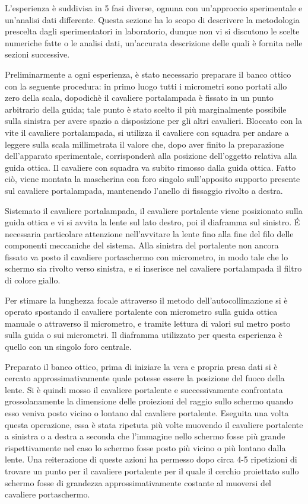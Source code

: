 L'esperienza \`e suddivisa in 5 fasi diverse, ognuna con 
un'approccio sperimentale e un'analisi dati differente. Questa 
sezione ha lo scopo di descrivere la metodologia prescelta dagli 
sperimentatori in laboratorio, dunque non vi si discutono le scelte 
numeriche fatte o le analisi dati, un'accurata descrizione delle 
quali è fornita nelle sezioni successive.

Preliminarmente a ogni esperienza, è stato necessario preparare il 
banco ottico con la seguente procedura: in primo luogo tutti i 
micrometri sono portati allo zero della scala, dopodichè il 
cavaliere portalampada \`e fissato in un punto arbitrario della 
guida; tale punto è stato scelto il più marginalmente possibile 
sulla sinistra per avere spazio a disposizione per gli altri 
cavalieri. Bloccato con la vite il cavaliere portalampada, si 
utilizza il cavaliere con squadra per andare a leggere sulla scala 
millimetrata il valore che, dopo aver finito la preparazione 
dell'apparato sperimentale, corrisponder\`a alla posizione 
dell'oggetto relativa alla guida ottica. Il cavaliere con squadra va 
subito rimosso dalla guida ottica. Fatto ciò, viene montata la 
mascherina con foro singolo sull'apposito supporto presente sul 
cavaliere portalampada, mantenendo l'anello di fissaggio rivolto a 
destra.

Sistemato il cavaliere portalampada, il cavaliere 
portalente viene posizionato sulla guida ottica e vi si avvita la 
lente sul lato destro, poi il diaframma sul sinistro. \'E necessaria 
particolare attenzione nell'avvitare la lente fino alla fine del 
filo delle componenti meccaniche del sistema. Alla sinistra del 
portalente non ancora fissato va posto il cavaliere portaschermo con 
micrometro, in modo tale che lo schermo sia rivolto verso sinistra, 
e si inserisce nel cavaliere portalampada il filtro di colore giallo.

Per stimare la lunghezza focale attraverso il metodo 
dell'autocollimazione si è operato spostando il cavaliere portalente 
con micrometro sulla guida ottica manuale o attraverso il 
micrometro, e tramite lettura di valori sul metro posto sulla guida 
o sui micrometri. Il diaframma utilizzato per questa esperienza è 
quello con un singolo foro centrale. 

Preparato il banco 
ottico, prima di iniziare la vera e propria presa dati si è cercato 
approssimativamente quale potesse essere la posizione del fuoco 
della lente. Si è quindi mosso il cavaliere portalente e 
successivamente confrontata grossolanamente la dimensione delle 
proiezioni del raggio sullo schermo quando esso veniva posto vicino 
o lontano dal cavaliere portalente. Eseguita una volta questa 
operazione, essa è stata ripetuta più volte muovendo il cavaliere 
portalente a sinistra o a destra a seconda che l'immagine nello 
schermo fosse più grande rispettivamente nel caso lo schermo fosse 
posto più vicino o più lontano dalla lente. Una reiterazione di 
queste azioni ha permesso dopo circa 4-5 ripetizioni di trovare un 
punto per il cavaliere portalente per il quale il cerchio proiettato 
sullo schermo fosse di grandezza approssimativamente costante al 
muoversi del cavaliere portaschermo. 

